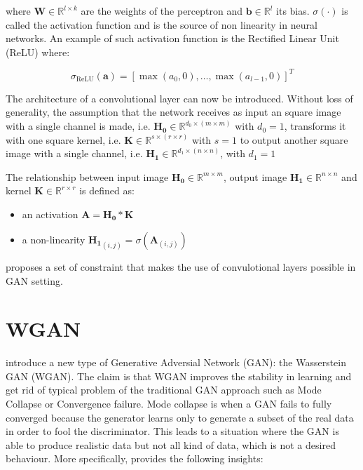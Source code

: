 \documentclass[11pt,a4paper,twoside]{report}
\begin{document}
where $\mathbf{W} \in \mathbb{R}^{l \times k}$ are the weights of the perceptron and $\mathbf{b} \in \mathbb{R}^l$ its bias. $\sigma(\cdot)$ is called the activation function and is the source of non linearity in neural networks. An example of such activation function is the Rectified Linear Unit (ReLU) where:

\begin{equation}
    \sigma_{\text{ReLU}}(\mathbf{a}) = [\max(a_0, 0), \dots, \max(a_{l-1}, 0)]^T
\end{equation}

The architecture of a convolutional layer can now be introduced. Without loss of generality, the assumption that the network receives as input an square image with a single channel is made, i.e. $\mathbf{H_0} \in \mathbb{R}^{d_0 \times (m \times m)}$ with $d_0 = 1$, transforms it with one square kernel, i.e. $\mathbf{K} \in \mathbb{R}^{s \times (r \times r)}$ with $s = 1$ to output another square image with a single channel, i.e. $\mathbf{H_1} \in \mathbb{R}^{d_1 \times (n \times n)}$, with $d_1 = 1$

The relationship between input image $\mathbf{H_0} \in \mathbb{R}^{m \times m}$, output image $\mathbf{H_1} \in \mathbb{R}^{n \times n}$ and kernel $\mathbf{K} \in \mathbb{R}^{r \times r}$ is defined as:


\begin{itemize} 
    \item an activation $\mathbf{A} = \mathbf{H_0} \ast \mathbf{K}$
    \item a non-linearity $\mathbf{H_1}_{(i,j)} = \sigma(\mathbf{A}_{(i,j)})$ 
\end{itemize}

\cite{radford2015unsupervised} proposes a set of constraint that makes the use of convulotional layers possible in GAN setting.


\section{WGAN}

\cite{arjovsky2017wasserstein} introduce a new type of Generative Adversial Network (GAN): the Wasserstein GAN (WGAN). The claim is that WGAN improves the stability in learning and get rid of typical problem of the traditional GAN approach such as Mode Collapse or Convergence failure. Mode collapse is when a GAN fails to fully converged because the generator learns only to generate a subset of the real data in order to fool the discriminator. This leads to a situation where the GAN is able to produce realistic data but not all kind of data, which is not a desired behaviour. More specifically, \cite{arjovsky2017wasserstein} provides the following insights:
\end{document}
